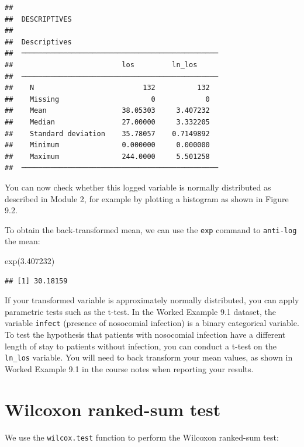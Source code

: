 \documentclass[
]{memoir}
\newenvironment{Shaded}{\begin{snugshade}}{\end{snugshade}}
\newcommand{\FloatTok}[1]{\textcolor[rgb]{0.00,0.00,0.81}{#1}}
\newcommand{\FunctionTok}[1]{\textcolor[rgb]{0.00,0.00,0.00}{#1}}
\newcommand{\NormalTok}[1]{#1}
\begin{document}
\begin{verbatim}
## 
##  DESCRIPTIVES
## 
##  Descriptives                                    
##  ─────────────────────────────────────────────── 
##                          los         ln_los      
##  ─────────────────────────────────────────────── 
##    N                          132          132   
##    Missing                      0            0   
##    Mean                  38.05303     3.407232   
##    Median                27.00000     3.332205   
##    Standard deviation    35.78057    0.7149892   
##    Minimum               0.000000     0.000000   
##    Maximum               244.0000     5.501258   
##  ───────────────────────────────────────────────
\end{verbatim}

You can now check whether this logged variable is normally distributed as described in Module 2, for example by plotting a histogram as shown in Figure 9.2.

To obtain the back-transformed mean, we can use the \texttt{exp} command to \texttt{anti-log} the mean:

\begin{Shaded}
\begin{Highlighting}[]
\FunctionTok{exp}\NormalTok{(}\FloatTok{3.407232}\NormalTok{)}
\end{Highlighting}
\end{Shaded}

\begin{verbatim}
## [1] 30.18159
\end{verbatim}

If your transformed variable is approximately normally distributed, you can apply parametric tests such as the t-test. In the Worked Example 9.1 dataset, the variable \texttt{infect} (presence of nosocomial infection) is a binary categorical variable. To test the hypothesis that patients with nosocomial infection have a different length of stay to patients without infection, you can conduct a t-test on the \texttt{ln\_los} variable. You will need to back transform your mean values, as shown in Worked Example 9.1 in the course notes when reporting your results.

\hypertarget{wilcoxon-ranked-sum-test}{%
\section{Wilcoxon ranked-sum test}\label{wilcoxon-ranked-sum-test}}

We use the \texttt{wilcox.test} function to perform the Wilcoxon ranked-sum test:
\end{document}
